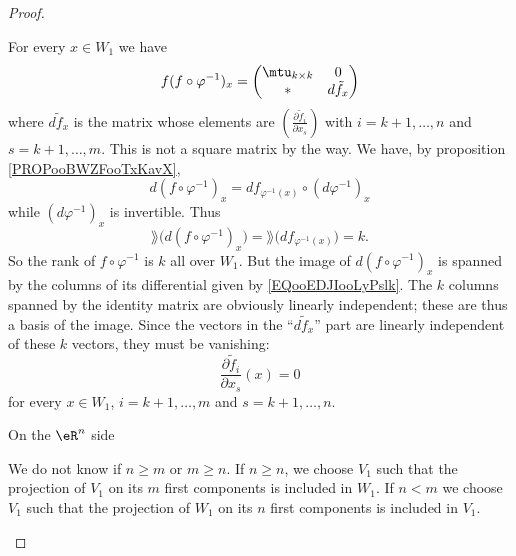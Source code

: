 \begin{proof}
\begin{subproof}
\begin{subproof}
                    For every \( x\in W_1\) we have
                    \begin{equation}        \label{EQooEDJIooLyPslk}
                        f(f\circ \varphi^{-1})_x=\begin{pmatrix}
                            \mtu_{k\times k}    &   0    \\ 
                            *    &   d\tilde f_x    
                        \end{pmatrix}
                    \end{equation}
                    where \( d\tilde f_x\) is the matrix whose elements are \( \left( \frac{ \partial \tilde f_i }{ \partial x_s } \right)\) with \( i=k+1,\ldots, n\) and \( s=k+1,\ldots, m\). This is not a square matrix by the way. We have, by proposition \ref{PROPooBWZFooTxKavX},
                    \begin{equation}
                        d(f\circ\varphi^{-1})_x=df_{\varphi^{-1}(x)}\circ(d\varphi^{-1})_x
                    \end{equation}
                    while \( (d\varphi^{-1})_x\) is invertible. Thus
                    \begin{equation}
                        \rang\big( d(f\circ\varphi^{-1})_x \big)=\rang\big( df_{\varphi^{-1}(x)} \big)=k.
                    \end{equation}
                    So the rank of \( f\circ\varphi^{-1}\) is \( k\) all over \( W_1\). But the image of \( d(f\circ\varphi^{-1})_x\) is spanned by the columns of its differential given by \eqref{EQooEDJIooLyPslk}. The \( k \) columns spanned by the identity matrix are obviously linearly independent; these are thus a basis of the image. Since the vectors in the ``\( d\tilde f_x\)'' part are linearly independent of these \( k\) vectors, they must be vanishing:
                    \begin{equation}
                        \frac{ \partial \tilde f_i }{ \partial x_s }(x)=0
                    \end{equation}
                    for every \( x\in W_1\), \( i=k+1,\ldots, m\) and \( s=k+1,\ldots, n\).

                \item[On the \( \eR^n\) side]

                    We do not know if \( n\geq m\) or \( m\geq n\). If \( n\geq n\), we choose \( V_1\) such that the projection of \( V_1\) on its \( m\) first components is included in \( W_1\). If \( n<m\) we choose \( V_1\) such that the projection of \( W_1\) on its \( n\) first components is included in \( V_1\).


\end{subproof}
\end{subproof}
\end{proof}
